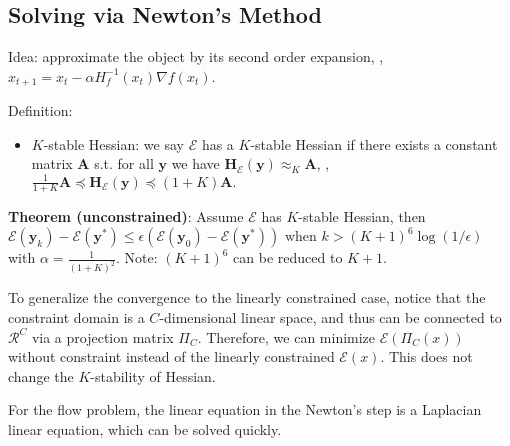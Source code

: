 \subsection{Solving via Newton's Method}

Idea: approximate the object by its second order expansion, \ie, $x_{t+1} = x_t - \alpha H_f^{-1}(x_t) \nabla f(x_t)$.

Definition:
\begin{itemize}
    \item $K$-stable Hessian: we say $\mathcal{E}$ has a $K$-stable Hessian if there exists a constant matrix $\boldsymbol{A}$ s.t. for all $\boldsymbol{y}$ we have
    $
    \boldsymbol{H}_{\mathcal{E}}(\boldsymbol{y}) \approx_{K} \boldsymbol{A}$, \ie, $ \frac{1}{1+K} \boldsymbol{A} \preceq \boldsymbol{H}_{\mathcal{E}}(\boldsymbol{y}) \preceq(1+K) \boldsymbol{A} .
    $
\end{itemize}

\textbf{Theorem (unconstrained)}: Assume $\mathcal{E}$ has $K$-stable Hessian, then $\mathcal{E}\left(\boldsymbol{y}_{k}\right)-\mathcal{E}\left(\boldsymbol{y}^{*}\right) \leq \epsilon\left(\mathcal{E}\left(\boldsymbol{y}_{0}\right)-\mathcal{E}\left(\boldsymbol{y}^{*}\right)\right) \text { when } k>(K+1)^{6} \log (1 / \epsilon)$ with $\alpha = \frac{1}{(1+K)^2}$. Note: $(K+1)^6$ can be reduced to $K+1$.

To generalize the convergence to the linearly constrained case, notice that the constraint domain is a $C$-dimensional linear space, and thus can be connected to $\mathcal{R}^C$ via a projection matrix $\Pi_C$. Therefore, we can minimize $\mathcal{E}(\Pi_C(x))$ without constraint instead of the linearly constrained $\mathcal{E}(x)$. This does not change the $K$-stability of Hessian.

For the flow problem, the linear equation in the Newton's step is a Laplacian linear equation, which can be solved quickly.